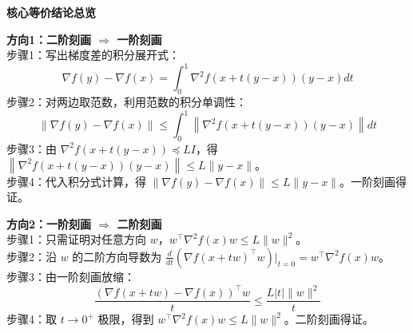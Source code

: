 \documentclass[10pt]{article}
\numberwithin{equation}{section}
\theoremstyle{plain}
\theoremstyle{definition}
\theoremstyle{remark}
\begin{document}
\textbf{核心等价结论总览}
\begin{center}
\renewcommand{\arraystretch}{1.3}
\end{center}

\begin{AnalysisBox}
\textbf{方向1：二阶刻画 $\Rightarrow$ 一阶刻画}\\
步骤1：写出梯度差的积分展开式：
\[ \displaystyle \nabla f(y) - \nabla f(x) = \int_0^1 \nabla^2 f\left(x+t(y-x)\right) (y-x) dt \]
步骤2：对两边取范数，利用范数的积分单调性：
\[ \displaystyle \|\nabla f(y) - \nabla f(x)\| \le \int_0^1 \left\| \nabla^2 f\left(x+t(y-x)\right) (y-x) \right\| dt \]
步骤3：由 $\nabla^2 f\left(x+t(y-x)\right) \preceq L I$，得 $\left\| \nabla^2 f\left(x+t(y-x)\right) (y-x) \right\| \le L \|y-x\|$。\\
步骤4：代入积分式计算，得 $\|\nabla f(y) - \nabla f(x)\| \le L \|y-x\|$。一阶刻画得证。

\textbf{方向2：一阶刻画 $\Rightarrow$ 二阶刻画}\\
步骤1：只需证明对任意方向 $w$，$w^\top \nabla^2 f(x) w \le L \|w\|^2$。\\
步骤2：沿 $w$ 的二阶方向导数为 $\displaystyle \frac{d}{dt} \left( \nabla f(x+tw)^\top w \right) \bigg|_{t=0} = w^\top \nabla^2 f(x) w$。\\
步骤3：由一阶刻画放缩：
\[ \displaystyle \frac{\left( \nabla f(x+tw) - \nabla f(x) \right)^\top w}{t} \le \frac{L |t| \|w\|^2}{t} \]
步骤4：取 $t \to 0^+$ 极限，得到 $w^\top \nabla^2 f(x) w \le L \|w\|^2$。二阶刻画得证。
\end{AnalysisBox}
\end{document}
